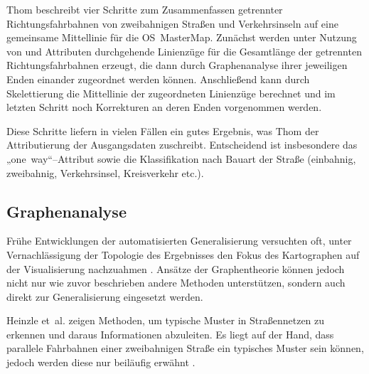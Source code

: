 \documentclass[../main/thesis.tex]{subfiles}
\begin{document}
Thom beschreibt vier Schritte zum Zusammenfassen getrennter Richtungsfahrbahnen von zweibahnigen Straßen und Verkehrsinseln auf eine gemeinsame Mittellinie für die OS~MasterMap. Zunächst werden unter Nutzung von  und Attributen durchgehende Linienzüge für die Gesamtlänge der getrennten Richtungsfahrbahnen erzeugt, die dann durch Graphenanalyse ihrer jeweiligen Enden einander zugeordnet werden können. Anschließend kann durch Skelettierung die Mittellinie der zugeordneten Linienzüge berechnet und im letzten Schritt noch Korrekturen an deren Enden vorgenommen werden. 

Diese Schritte liefern in vielen Fällen ein gutes Ergebnis, was Thom der Attributierung der Ausgangsdaten zuschreibt. Entscheidend ist insbesondere das „one~way“–Attribut sowie die Klassifikation nach Bauart der Straße (einbahnig, zweibahnig, Verkehrsinsel, Kreisverkehr etc.). 


\subsection{Graphenanalyse}



Frühe Entwicklungen der automatisierten Generalisierung versuchten oft, unter Vernachlässigung der Topologie des Ergebnisses den Fokus des Kartographen auf der Visualisierung nachzuahmen . Ansätze der Graphentheorie können jedoch nicht nur wie zuvor beschrieben andere Methoden unterstützen, sondern auch direkt zur Generalisierung eingesetzt werden.


Heinzle et~al. zeigen Methoden, um typische Muster in Straßennetzen zu erkennen und daraus Informationen abzuleiten. 
Es liegt auf der Hand, dass parallele Fahrbahnen einer zweibahnigen Straße ein typisches Muster sein können, jedoch werden diese nur beiläufig erwähnt .
\end{document}
